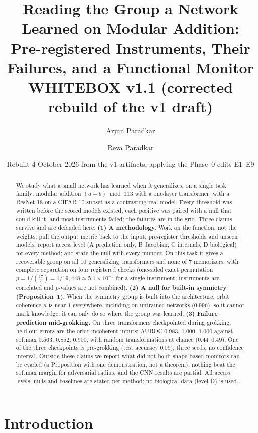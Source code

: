 \documentclass[11pt]{article}
\title{Reading the Group a Network Learned on Modular Addition:\\
Pre-registered Instruments, Their Failures, and a Functional Monitor\\[2pt]
\large WHITEBOX v1.1 (corrected rebuild of the v1 draft)}
\author{Arjun Paradkar \and Reva Paradkar}
\date{Rebuilt 4 October 2026 from the v1 artifacts, applying the Phase~0 edits E1--E9}
\begin{document}
\maketitle

\begin{abstract}
We study what a small network has learned when it generalizes, on a single task family: modular addition $(a+b)\bmod 113$ with a one-layer transformer, with a ResNet-18 on a CIFAR-10 subset as a contrasting real model.
Every threshold was written before the scored models existed, each positive was paired with a null that could kill it, and most instruments failed; the failures are in the grid.
Three claims survive and are defended here.
\textbf{(1) A methodology.} Work on the function, not the weights; pull the output metric back to the input; pre-register thresholds and unseen models; report access level (A prediction only, B Jacobian, C internals, D biological) for every method; and state the null with every number. On this task it gives a recoverable group on all 10 generalizing transformers and none of 7 memorizers, with complete separation on four registered checks (one-sided exact permutation $p = 1/\binom{17}{7} = 1/19{,}448 \approx 5.1\times10^{-5}$ for a single instrument; instruments are correlated and $p$-values are not combined).
\textbf{(2) A null for built-in symmetry (Proposition~1).} When the symmetry group is built into the architecture, orbit coherence $\kappa$ is near $1$ everywhere, including on untrained networks ($0.996$), so it cannot mark knowledge; it can only do so where the group was learned.
\textbf{(3) Failure prediction mid-grokking.} On three transformers checkpointed during grokking, held-out errors are the orbit-incoherent inputs: AUROC $0.983$, $1.000$, $1.000$ against softmax $0.563$, $0.852$, $0.900$, with random transformations at chance ($0.44$--$0.49$). One of the three checkpoints is pre-grokking (test accuracy $0.09$); three seeds, no confidence interval.
Outside these claims we report what did not hold: shape-based monitors can be evaded (a Proposition with one demonstration, not a theorem), nothing beat the softmax margin for adversarial radius, and the CNN results are partial.
All access levels, nulls and baselines are stated per method; no biological data (level D) is used.
\end{abstract}

\section{Introduction}
\end{document}
